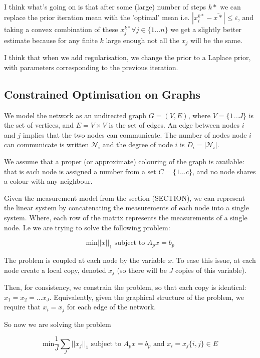 \documentclass[titlepage]{article}
\begin{document}
I think what's going on is that after some (large) number of steps \(k*\) we can replace the prior iteration mean with the 'optimal' mean i.e. \(|x_i^{k*} - \bar{x*}| \leq \varepsilon \), and taking a convex combination of these \(x_j^{k*} \forall j \in \{1\ldots n\}\) we get a slightly better estimate because for any finite \(k\) large enough not all the \(x_j\) will be the same.

I think that when we add regularisation, we change the prior to a Laplace prior, with parameters corresponding to the previous iteration. 

\subsection{Constrained Optimisation on Graphs}
We model the network as an undirected graph \(G = \left(V,E\right)\), where \(V = \{1 \ldots J\}\) is the set of vertices, and \(E = V \times V\) is the set of edges. An edge between nodes \(i\) and \(j\) implies that the two nodes can communicate. The number of nodes node \(i\) can communicate is written \(\mathcal{N}_i\) and the degree of node \(i\) is \(D_i = |\mathcal{N}_i|\). 

We assume that a proper (or approximate) colouring of the graph is available: that is each node is assigned a number from a set \(C = \{1 \ldots c \} \), and no node shares a colour with any neighbour.

Given the measurement model from the section (SECTION), we can represent the linear system by concatenating the measurements of each node into a single system. Where, each row of the matrix represents the measurements of a single node. I.e we are trying to solve the following problem:

\begin{equation}
\text{min} ||x||_1 \text{ subject to } A_p x = b_p
\end{equation}

The problem is coupled at each node by the variable \(x\). To ease this issue, at each node create a local copy, denoted \(x_j\) (so there will be \(J\) copies of this variable). 

Then, for consistency, we constrain the problem, so that each copy is identical: \(x_1 = x_2 = \ldots x_J\). Equivalently, given the graphical structure of the problem, we require that \(x_i = x_j\) for each edge of the network.

So now we are solving the problem

\begin{equation}
\text{min} \frac{1}{J}\sum_J||x_j||_1 \text{ subject to } A_p x = b_p \text{ and } x_i = x_j \{i,j\} \in E 
 \label{constrainedbp}
\end{equation}
 
\end{document}
